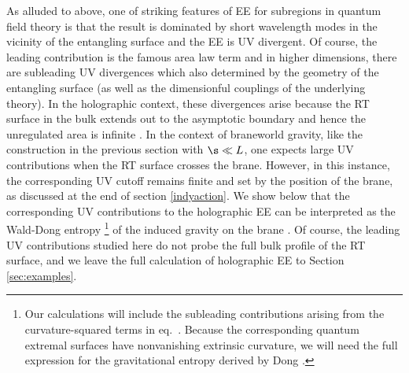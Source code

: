 As alluded to above, one of striking features of EE for subregions in quantum field theory is that the result is dominated by short wavelength modes in the vicinity of the entangling surface and the EE is UV divergent. Of course, the leading contribution is the famous area law term \cite{Sorkin_1983,Bombelli:1986rw,Srednicki:1993im} and in higher dimensions, there are subleading UV divergences which also determined by the geometry of the entangling surface (as well as the dimensionful couplings of the underlying theory). In the holographic context, these divergences arise because the RT surface in the bulk extends out to the asymptotic boundary and hence the unregulated area is infinite \cite{Ryu:2006bv,Ryu:2006ef,Rangamani:2016dms}. In the context of braneworld gravity, like the construction in the previous section with $\s\ll L$, one expects large UV contributions when the RT surface crosses the brane. However, in this instance, the corresponding UV cutoff remains finite and set by the position of the brane, as discussed at the end of section \ref{indyaction}. We show below that the corresponding UV contributions to the holographic EE can be interpreted as the Wald-Dong entropy \cite{Wald:1993nt,Iyer:1994ys,Jacobson:1993vj,Dong:2013qoa}\footnote{Our calculations will include the subleading contributions arising from the curvature-squared terms in eq.~. Because the corresponding quantum extremal surfaces have nonvanishing extrinsic curvature, we will need the full expression for the gravitational entropy derived by Dong \cite{Dong:2013qoa}.} of the induced gravity on the brane \cite{Emparan:2006ni,Myers:2013lva}. Of course, the leading UV contributions studied here do not probe the full bulk profile of the RT surface, and we leave the full calculation of holographic EE to Section \ref{sec:examples}.

\rcm{*******}



 
%


